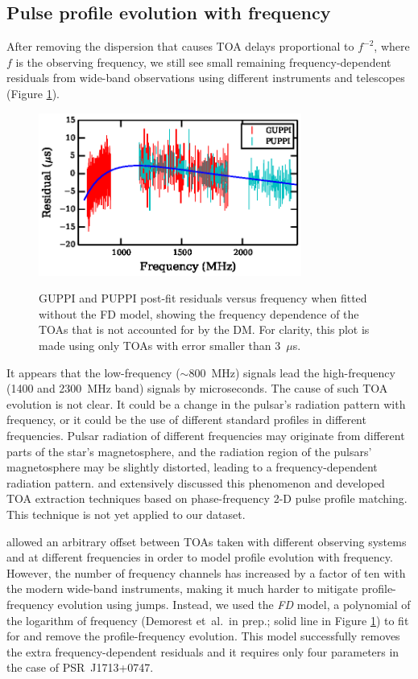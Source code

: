 \subsection{Pulse profile evolution with frequency}
\label{sec:FD}
After removing the dispersion that causes TOA delays proportional to $f^{-2}$,
where $f$ is the observing frequency,
 we still see small remaining frequency-dependent residuals from wide-band
observations using
different instruments and telescopes (Figure \ref{fig:FD}). 
%
\begin{figure}
\includegraphics[width=3.4in]{FD.ps} \\ 
\caption {\label{fig:FD} GUPPI and PUPPI post-fit residuals versus frequency when fitted
without the FD model, showing the frequency dependence of the TOAs that is 
not accounted for by the DM. For
clarity, this plot is made using only TOAs with error smaller than 3~$\mu$s.} 
\end{figure} 
% 
It appears that the low-frequency ($\sim$800~MHz) signals lead the
high-frequency (1400 and 2300~MHz band) signals by microseconds.
The cause of such TOA evolution is not clear. It could be a change in the pulsar's
radiation pattern with frequency, or it could be the use of different
standard profiles in different frequencies. Pulsar radiation of different frequencies may originate from
different parts of the star's magnetosphere, and 
the radiation region of the pulsars' magnetosphere may be slightly distorted,
leading to a frequency-dependent radiation pattern. \citet{pdr14} and \citet{ldc+14} 
extensively discussed this phenomenon and developed TOA extraction techniques
based on phase-frequency 2-D pulse profile matching. This technique is not
yet applied to our dataset.

\citet{dfg+13} allowed an arbitrary offset between TOAs taken with different
observing systems and at different frequencies in order to model profile
evolution with frequency.
However, the number of frequency
channels has increased by a factor of ten with the modern wide-band
instruments, making it much harder to mitigate profile-frequency evolution using jumps. 
Instead, we used the {\it FD} model, a polynomial of the logarithm of
frequency (Demorest et~al.\ in prep.; solid line in Figure
\ref{fig:FD}) to fit for and remove the profile-frequency
evolution. This model successfully removes the extra
frequency-dependent residuals and it requires only four parameters in the
case of PSR~J1713+0747.


